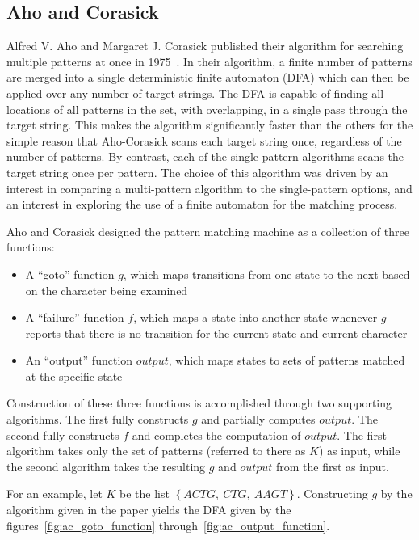 \subsection{Aho and Corasick}

Alfred V. Aho and Margaret J. Corasick published their algorithm for searching multiple patterns at once in 1975~\cite{aho}. In their algorithm, a finite number of patterns are merged into a single deterministic finite automaton (DFA) which can then be applied over any number of target strings. The DFA is capable of finding all locations of all patterns in the set, with overlapping, in a single pass through the target string. This makes the algorithm significantly faster than the others for the simple reason that Aho-Corasick scans each target string once, regardless of the number of patterns. By contrast, each of the single-pattern algorithms scans the target string once per pattern. The choice of this algorithm was driven by an interest in comparing a multi-pattern algorithm to the single-pattern options, and an interest in exploring the use of a finite automaton for the matching process.

Aho and Corasick designed the pattern matching machine as a collection of three functions:

\begin{itemize}
\item A ``goto'' function $g$, which maps transitions from one state to the next based on the character being examined
\item A ``failure'' function $f$, which maps a state into another state whenever $g$ reports that there is no transition for the current state and current character
\item An ``output'' function $output$, which maps states to sets of patterns matched at the specific state
\end{itemize}

Construction of these three functions is accomplished through two supporting algorithms. The first fully constructs $g$ and partially computes $output$. The second fully constructs $f$ and completes the computation of $output$. The first algorithm takes only the set of patterns (referred to there as $K$) as input, while the second algorithm takes the resulting $g$ and $output$ from the first as input.

For an example, let $K$ be the list $\left\lbrace ACTG,~CTG,~AAGT \right\rbrace$. Constructing $g$ by the algorithm given in the paper yields the DFA given by the figures~\ref{fig:ac_goto_function} through~\ref{fig:ac_output_function}.

